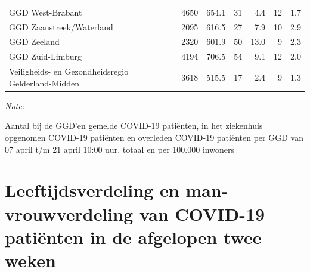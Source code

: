 \documentclass[
  english,
  man,floatsintext]{apa6}
\begin{document}
\begin{table}
\begin{threeparttable}
\begin{tabular}{lrrrrrr}
GGD West-Brabant & 4650 & 654.1 & 31 & 4.4 & 12 & 1.7\\
GGD Zaanstreek/Waterland & 2095 & 616.5 & 27 & 7.9 & 10 & 2.9\\
GGD Zeeland & 2320 & 601.9 & 50 & 13.0 & 9 & 2.3\\
GGD Zuid-Limburg & 4194 & 706.5 & 54 & 9.1 & 12 & 2.0\\
Veiligheids- en Gezondheidsregio Gelderland-Midden & 3618 & 515.5 & 17 & 2.4 & 9 & 1.3\\
\bottomrule
\end{tabular}
\begin{tablenotes}
\item \textit{Note: } 
\item Aantal bij de GGD’en gemelde COVID-19 patiënten, in het ziekenhuis opgenomen COVID-19 patiënten en overleden COVID-19 patiënten per GGD van 07 april t/m 21 april 10:00 uur, totaal en per 100.000 inwoners
\end{tablenotes}
\end{threeparttable}
\endgroup{}
\end{table}

\newpage

\hypertarget{leeftijdsverdeling-en-man-vrouwverdeling-van-covid-19-patiuxebnten-in-de-afgelopen-twee-weken}{%
\section{Leeftijdsverdeling en man-vrouwverdeling van COVID-19 patiënten in de afgelopen twee weken}\label{leeftijdsverdeling-en-man-vrouwverdeling-van-covid-19-patiuxebnten-in-de-afgelopen-twee-weken}}
\end{document}
